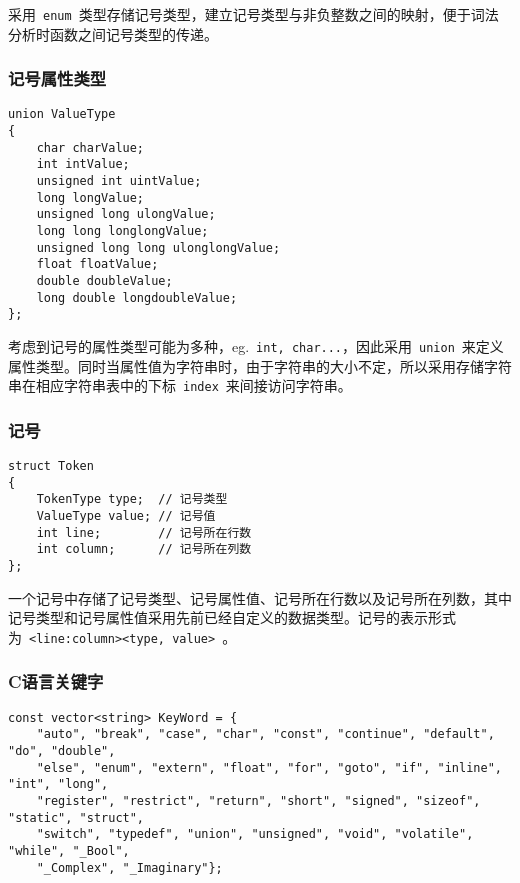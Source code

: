 \documentclass[lang=cn,11pt,a4paper]{paper}
\begin{document}
采用\ \lstinline{enum}\ 类型存储记号类型，建立记号类型与非负整数之间的映射，便于词法分析时函数之间记号类型的传递。

\subsubsection{记号属性类型}

\begin{lstlisting}
union ValueType
{
    char charValue;
    int intValue;
    unsigned int uintValue;
    long longValue;
    unsigned long ulongValue;
    long long longlongValue;
    unsigned long long ulonglongValue;
    float floatValue;
    double doubleValue;
    long double longdoubleValue;
};
\end{lstlisting}

考虑到记号的属性类型可能为多种，eg.\ \lstinline{int, char...}，因此采用\ \lstinline{union}\ 来定义属性类型。同时当属性值为字符串时，由于字符串的大小不定，所以采用存储字符串在相应字符串表中的下标\ \lstinline{index}\ 来间接访问字符串。

\subsubsection{记号}

\begin{lstlisting}
struct Token
{
    TokenType type;  // 记号类型
    ValueType value; // 记号值
    int line;        // 记号所在行数
    int column;      // 记号所在列数
};
\end{lstlisting}

一个记号中存储了记号类型、记号属性值、记号所在行数以及记号所在列数，其中记号类型和记号属性值采用先前已经自定义的数据类型。记号的表示形式为\ \lstinline{<line:column><type, value>}\ 。

\subsubsection{C语言关键字}

\begin{lstlisting}
const vector<string> KeyWord = {
    "auto", "break", "case", "char", "const", "continue", "default", "do", "double",
    "else", "enum", "extern", "float", "for", "goto", "if", "inline", "int", "long",
    "register", "restrict", "return", "short", "signed", "sizeof", "static", "struct",
    "switch", "typedef", "union", "unsigned", "void", "volatile", "while", "_Bool",
    "_Complex", "_Imaginary"};
\end{lstlisting}
\end{document}
